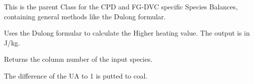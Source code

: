 \documentclass[letterpaper,10pt,english]{sphinxmanual}
\begin{document}
\begin{fulllineitems}
\label{FGDVCClasses:Compos_and_Energy.SpeciesBalance}
This is the parent Class for the CPD and FG-DVC specific Species Balances, containing general methods like the Dulong formular.

\begin{fulllineitems}
\label{FGDVCClasses:Compos_and_Energy.SpeciesBalance.Dulong}
Uses the Dulong formular to calculate the Higher heating value. The output is in J/kg.

\end{fulllineitems}


\begin{fulllineitems}
\label{FGDVCClasses:Compos_and_Energy.SpeciesBalance.SpeciesIndex}
Returns the column number of the input species.

\end{fulllineitems}


\begin{fulllineitems}
\label{FGDVCClasses:Compos_and_Energy.SpeciesBalance.correctUA}
The difference of the UA to 1 is putted to coal.

\end{fulllineitems}


\end{fulllineitems}

\end{document}
